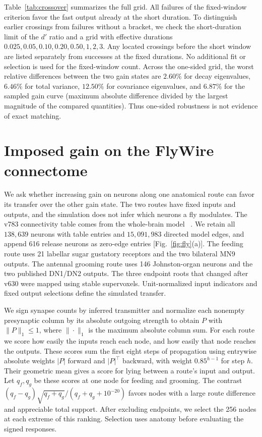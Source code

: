 \documentclass[aps,10pt,onecolumn,superscriptaddress,nofootinbib,
  longbibliography,amsmath,amssymb,floatfix]{revtex4-2}
\begin{document}
Table~\ref{tab:crossover} summarizes the full grid. All failures
of the fixed-window criterion favor the fast output already at
the short duration. To distinguish earlier crossings from
failures without a bracket, we check the short-duration limit
of the \(d'\) ratio and a grid with effective durations
\(0.025,0.05,0.10,0.20,0.50,1,2,3\). Any located crossings
before the short window are listed separately from successes
at the fixed durations. No additional fit or selection is
used for the fixed-window count. Across the one-sided grid,
the worst relative differences between the two gain states
are \(2.60\%\) for decay eigenvalues, \(6.46\%\) for total
variance, \(12.50\%\) for covariance eigenvalues, and \(6.87\%\)
for the sampled gain curve (maximum absolute difference
divided by the largest magnitude of the compared quantities).
Thus one-sided robustness is not evidence of exact matching.



\section{Imposed gain on the FlyWire connectome}
\label{sec:fly}

We ask whether increasing gain on neurons along one anatomical
route can favor its transfer over the other gain state. The two
routes have fixed inputs and outputs, and the simulation does not
infer which neurons a fly modulates. The v783 connectivity table
comes from the whole-brain model
~\cite{shiu2024,dorkenwald2024}. We retain all \(138{,}639\) neurons
with table entries and \(15{,}091{,}983\) directed model edges, and
append 616 release neurons as zero-edge entries [Fig.~\ref{fig:fly}(a)].
The feeding route
uses 21 labellar sugar gustatory receptors and the two bilateral MN9
outputs. The antennal grooming route uses 146 Johnston-organ neurons
and the two published DN1/DN2 outputs. The three endpoint roots that
changed after v630 were mapped using stable supervoxels. Unit-normalized
input indicators and fixed output selections define the simulated
transfer.

We sign synapse counts by inferred transmitter and normalize each
nonempty presynaptic column by its absolute outgoing strength to obtain
\(P\) with \(\|P\|_1\le1\), where \(\|\cdot\|_1\) is the maximum
absolute column sum. For each route we score how easily the inputs
reach each node, and how easily that node reaches the outputs.
These scores sum the first eight steps of propagation using
entrywise absolute weights \(|P|\) forward and \(|P|^\top\) backward,
with weight \(0.85^{h-1}\) for step \(h\). Their geometric mean
gives a score for lying between a route's input and output.
Let \(q_f,q_g\) be these scores at one node for feeding and grooming.
The contrast \((q_f-q_g)\sqrt{q_f+q_g}/(q_f+q_g+10^{-20})\)
favors nodes with a large route difference and appreciable total
support. After excluding endpoints, we select the 256 nodes at
each extreme of this ranking. Selection uses anatomy before
evaluating the signed responses.
\end{document}
